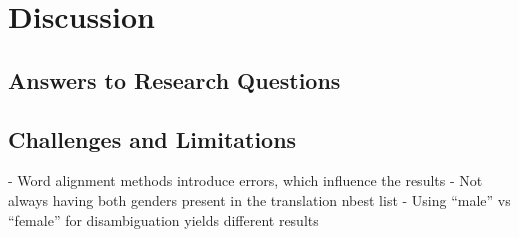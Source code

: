 \chapter{Discussion}
\label{ch:Discussion}

\section{Answers to Research Questions}
\label{sec:Discussion:Answers}

\section{Challenges and Limitations}
\label{sec:Discussion:Challenges}

- Word alignment methods introduce errors, which influence the results
- Not always having both genders present  in the translation nbest list
- Using “male” vs “female” for disambiguation yields different results
